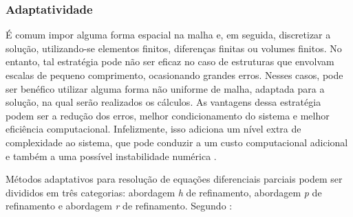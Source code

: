 \subsubsection{Adaptatividade}
\label{cap_adaptatividade}

É comum impor alguma forma espacial na malha e, em seguida, discretizar a solução, utilizando-se elementos finitos, diferenças finitas ou volumes finitos. No entanto, tal estratégia pode não ser eficaz no caso de estruturas que envolvam escalas de pequeno comprimento, ocasionando grandes erros. Nesses casos, pode ser benéfico utilizar alguma forma não uniforme de malha, adaptada para a solução, na qual serão realizados os cálculos. As vantagens dessa estratégia podem ser a redução dos erros, melhor condicionamento do sistema e melhor eficiência computacional. Infelizmente, isso adiciona um nível extra de complexidade ao sistema, que pode conduzir a um custo computacional adicional e também a uma possível instabilidade numérica \cite{Huang2009}.

Métodos adaptativos para resolução de equações diferenciais parciais podem ser divididos em três categorias: abordagem {\it h} de refinamento, abordagem {\it p} de refinamento e abordagem {\it r} de refinamento. Segundo : 

